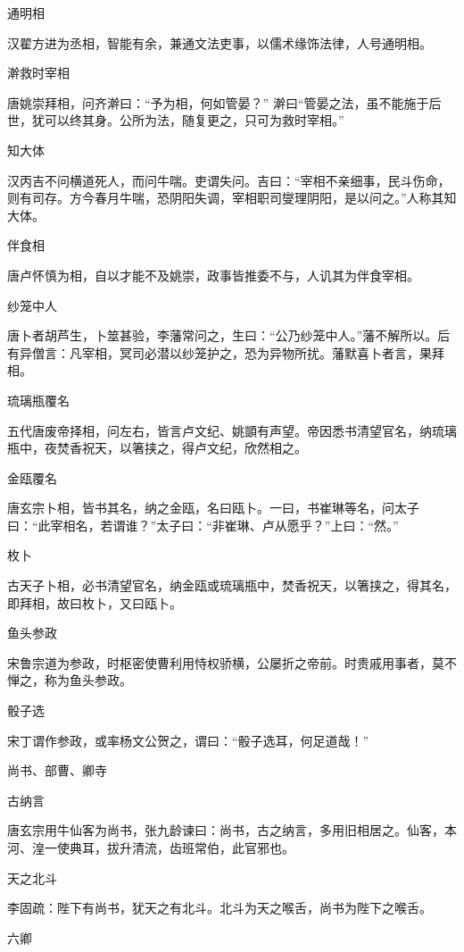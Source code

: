 \documentclass[a4paper,12pt,UTF8,twoside]{ctexbook}
\begin{document}
    通明相
    
    汉翟方进为丞相，智能有余，兼通文法吏事，以儒术缘饰法律，人号通明相。
    
    澣救时宰相
    
    唐姚崇拜相，问齐澣曰：“予为相，何如管晏？” 澣曰“管晏之法，虽不能施于后世，犹可以终其身。公所为法，随复更之，只可为救时宰相。”
    
    知大体
    
    汉丙吉不问横道死人，而问牛喘。吏谓失问。吉曰：“宰相不亲细事，民斗伤命，则有司存。方今春月牛喘，恐阴阳失调，宰相职司燮理阴阳，是以问之。”人称其知大体。
    
    伴食相
    
    唐卢怀慎为相，自以才能不及姚崇，政事皆推委不与，人讥其为伴食宰相。
    
    纱笼中人
    
    唐卜者胡芦生，卜筮甚验，李藩常问之，生曰：“公乃纱笼中人。”藩不解所以。后有异僧言：凡宰相，冥司必潜以纱笼护之，恐为异物所扰。藩默喜卜者言，果拜相。
    
    琉璃瓶覆名
    
    五代唐废帝择相，问左右，皆言卢文纪、姚顗有声望。帝因悉书清望官名，纳琉璃瓶中，夜焚香祝天，以箸挟之，得卢文纪，欣然相之。
    
    金瓯覆名
    
    唐玄宗卜相，皆书其名，纳之金瓯，名曰瓯卜。一曰，书崔琳等名，问太子曰：“此宰相名，若谓谁？”太子曰：“非崔琳、卢从愿乎？”上曰：“然。”
    
    枚卜
    
    古天子卜相，必书清望官名，纳金瓯或琉璃瓶中，焚香祝天，以箸挟之，得其名，即拜相，故曰枚卜，又曰瓯卜。
    
    鱼头参政
    
    宋鲁宗道为参政，时枢密使曹利用恃权骄横，公屡折之帝前。时贵戚用事者，莫不惮之，称为鱼头参政。
    
    骰子选
    
    宋丁谓作参政，或率杨文公贺之，谓曰：“骰子选耳，何足道哉！”
    
    尚书、部曹、卿寺
    
    古纳言
    
    唐玄宗用牛仙客为尚书，张九龄谏曰：尚书，古之纳言，多用旧相居之。仙客，本河、湟一使典耳，拔升清流，齿班常伯，此官邪也。
    
    天之北斗
    
    李固疏：陛下有尚书，犹天之有北斗。北斗为天之喉舌，尚书为陛下之喉舌。
    
    六卿
    
\end{document}
